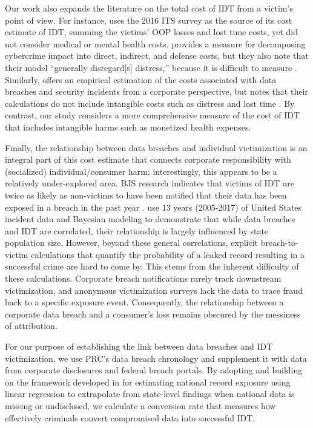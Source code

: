 Our work also expands the literature on the total cost of IDT from a victim's point of view. For instance, \citet{Miller2021} %
uses the 2016 ITS survey as the source of its cost estimate of IDT, summing the victims' OOP losses and lost time costs, yet did not consider medical or mental health costs. \citet{Anderson2013Measuring} provides a measure for decomposing cybercrime impact into direct, indirect, and defense costs, but they also note that their model ``generally disregard[s] distress,'' because it is difficult to measure \cite{Anderson2013Measuring}. Similarly, \cite{Romanosky2016Examining} offers an empirical estimation of the costs associated with data breaches and security incidents from a corporate perspective, but notes that their calculations do not include intangible costs such as distress and lost time \cite{Romanosky2016Examining}. By contrast, our study considers a more comprehensive measure of the cost of IDT that includes intangible harms such as monetized health expenses.

Finally, the relationship between data breaches and individual victimization is an integral part of this cost estimate that connects corporate responsibility with (socialized) individual/consumer harm; interestingly, this appears to be a relatively under-explored area. BJS research indicates that victims of IDT are twice as likely as non-victims to have been notified that their data has been exposed in a breach in the past year \cite{Harrell2024Stats}. \citet{Bisogni2020More} use 13 years (2005-2017) of United States incident data and Bayesian modeling to demonstrate that while data breaches and IDT are correlated, their relationship is largely influenced by state population size. However, beyond these general correlations, explicit breach-to-victim calculations that quantify the probability of a leaked record resulting in a successful crime are hard to come by. This stems from the inherent difficulty of these calculations. Corporate breach notifications rarely track downstream victimization, and anonymous victimization surveys lack the data to trace fraud back to a specific exposure event. Consequently, the relationship between a corporate data breach and a consumer's loss remains obscured by the messiness of attribution.

For our purpose of establishing the link between data breaches and IDT victimization, we use PRC's data breach chronology and supplement it with data from corporate disclosures and federal breach portals. 
By adopting and building on the framework developed in \citet{Graves2018Should} for estimating national record exposure using linear regression to extrapolate from state-level findings when national data is missing or undisclosed, we calculate a conversion rate that measures how effectively criminals convert compromised data into successful IDT.
